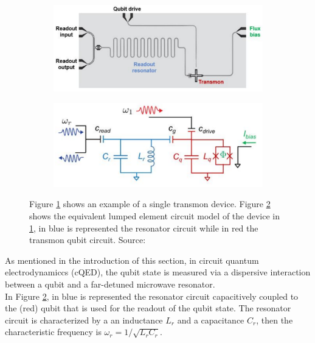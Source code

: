 \begin{figure}[h!]
    \centering
    \begin{subfigure}{0.47\textwidth}
        \centering
        \includegraphics[width=\textwidth]{figures/png/TransmonBoard.png}
        \subcaption{}
        \label{fig:TransmonBoard}
    \end{subfigure}
    \hfill
    \begin{subfigure}{0.47\textwidth}
        \centering
        \includegraphics[width=\textwidth]{figures/png/TransmonCircuit.png}
        \subcaption{}
        \label{fig:TransmonCircuit}
    \end{subfigure}
    \caption{Figure \ref{fig:TransmonBoard} shows an example of a single transmon device. Figure \ref{fig:TransmonCircuit} shows the equivalent lumped element circuit model of the device in \ref{fig:TransmonBoard}, in blue is represented the resonator circuit while in red the transmon qubit circuit. Source: \cite{Roth_2023}}
    \label{fig:Transmon_model}
\end{figure}

As mentioned in the introduction of this section, in circuit quantum electrodynamiccs (cQED), the qubit state is measured via a dispersive interaction between a qubit and a far-detuned microwave resonator.\\
In Figure \ref{fig:TransmonCircuit}, in blue is represented the resonator circuit capacitively coupled to the (red) qubit that is used for the readout of the qubit state. 
The resonator circuit is characterized by a an inductance $L_r$ and a capacitance $C_r$, then the characteristic frequency is $\omega_r =  1/\sqrt{L_r C_r}$. 

